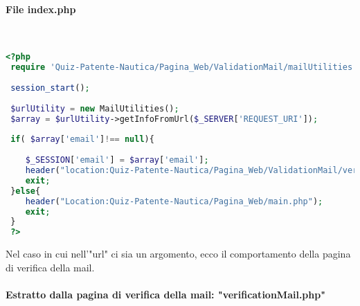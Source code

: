  \paragraph{File index.php}\leavevmode\\
  
 \begin{lstlisting}[language=php]
 <?php
 require 'Quiz-Patente-Nautica/Pagina_Web/ValidationMail/mailUtilities.php';
 
 session_start();
 
 $urlUtility = new MailUtilities();
 $array = $urlUtility->getInfoFromUrl($_SERVER['REQUEST_URI']);
 
 if( $array['email']!== null){	
 	
 	$_SESSION['email'] = $array['email'];
 	header("location:Quiz-Patente-Nautica/Pagina_Web/ValidationMail/verificationMail.php");
 	exit;
 }else{
 	header("Location:Quiz-Patente-Nautica/Pagina_Web/main.php");
 	exit;
 }
 ?>
 \end{lstlisting}
 
 Nel caso in cui nell'"url" ci sia un argomento, ecco il comportamento della pagina di verifica della mail.\\
 
\paragraph{Estratto dalla pagina di verifica della mail: "verificationMail.php"}\leavevmode\\
 
